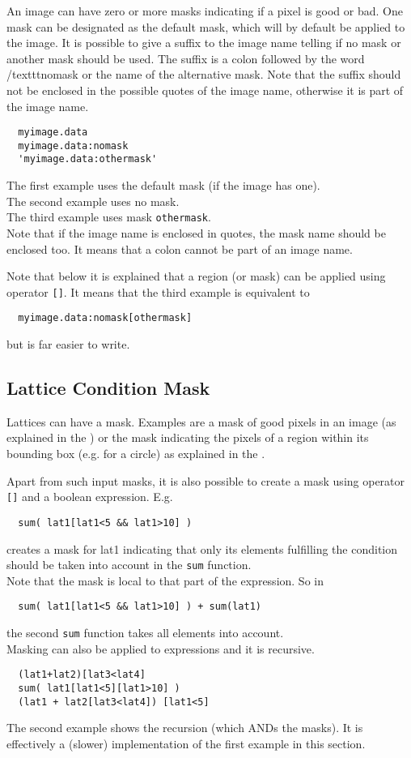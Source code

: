 An image can have zero or more masks indicating if a pixel is good or
bad. One mask can be designated as the default mask, which will
by default be applied to the image. It is possible to give a suffix
to the image name telling if no mask or another mask should be used.
The suffix is a colon followed by the word /texttt{nomask}
or the name of the alternative mask. Note that the suffix should
not be enclosed in the possible quotes of the image name, otherwise
it is part of the image name.
\begin{verbatim}
  myimage.data
  myimage.data:nomask
  'myimage.data:othermask'
\end{verbatim}
The first example uses the default mask (if the image has one).
\\The second example uses no mask.
\\The third example uses mask \texttt{othermask}.
\\Note that if the image name is enclosed in quotes, the mask name
should be enclosed too. It means that a colon cannot be part of
an image name.

Note that below it is explained that a region (or mask) can
be applied using operator \texttt{[]}. It means that the third
example is equivalent to
\begin{verbatim}
  myimage.data:nomask[othermask]
\end{verbatim}
but is far easier to write.

\subsection{\label{LEL:CONDITIONS}Lattice Condition Mask}
Lattices can have a mask. Examples are a mask of good pixels in an
image (as explained in the )
or the mask indicating the pixels of a region within its bounding box
(e.g. for a circle) as explained in the .

Apart from such input masks, it is also possible to create a mask
using operator \texttt{[]} and a boolean expression. E.g.
\begin{verbatim}
  sum( lat1[lat1<5 && lat1>10] )
\end{verbatim}
creates a mask for lat1 indicating that only its elements fulfilling
the condition should be taken into account in the \texttt{sum}
function.
\\Note that the mask is local to that part of the expression. So in
\begin{verbatim}
  sum( lat1[lat1<5 && lat1>10] ) + sum(lat1)
\end{verbatim}
the second \texttt{sum} function takes all elements into account.
\\Masking can also be applied to expressions and it is recursive.
\begin{verbatim}
  (lat1+lat2)[lat3<lat4]
  sum( lat1[lat1<5][lat1>10] )
  (lat1 + lat2[lat3<lat4]) [lat1<5]
\end{verbatim}
The second example shows the recursion (which ANDs the masks).
It is effectively a (slower) implementation of the
first example in this section.

